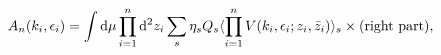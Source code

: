 \begin{equation}
A_n(k_i,\epsilon_i)   =   \int {\rm d} \mu \prod_{i=1}^n {\rm d}^2
z_i \sum_{s}\eta_s Q_s \langle \prod_{i=1}^n
V(k_i,\epsilon_i;z_i,\bar z_i) \rangle_s \times ({\rm right~part})
\label{eqoneloop},
\end{equation}

